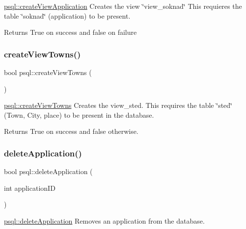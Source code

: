 \mbox{\hyperlink{classpsql_ad6fb8e1e7177c7996f297d477ecceb27}{psql\+::create\+View\+Application}} Creates the view \char`\"{}view\+\_\+soknad\char`\"{} This requieres the table \char`\"{}soknad\char`\"{} (application) to be present. 

\begin{DoxyReturn}{Returns}
True on success and false on failure 
\end{DoxyReturn}
\mbox{\label{classpsql_ac5b1230ac405a600b67b144060b33a0d}} 
\subsubsection{\texorpdfstring{create\+View\+Towns()}{createViewTowns()}}
{\footnotesize\ttfamily bool psql\+::create\+View\+Towns (\begin{DoxyParamCaption}{ }\end{DoxyParamCaption})}



\mbox{\hyperlink{classpsql_ac5b1230ac405a600b67b144060b33a0d}{psql\+::create\+View\+Towns}} Creates the view\+\_\+sted. This requires the table \char`\"{}sted\char`\"{} (Town, City, place) to be present in the database. 

\begin{DoxyReturn}{Returns}
True on success and false otherwise. 
\end{DoxyReturn}
\mbox{\label{classpsql_a999ee8e2d813892411ef502ebc055a79}} 
\subsubsection{\texorpdfstring{delete\+Application()}{deleteApplication()}}
{\footnotesize\ttfamily bool psql\+::delete\+Application (\begin{DoxyParamCaption}\item[{int}]{application\+ID }\end{DoxyParamCaption})}



\mbox{\hyperlink{classpsql_a999ee8e2d813892411ef502ebc055a79}{psql\+::delete\+Application}} Removes an application from the database. 


